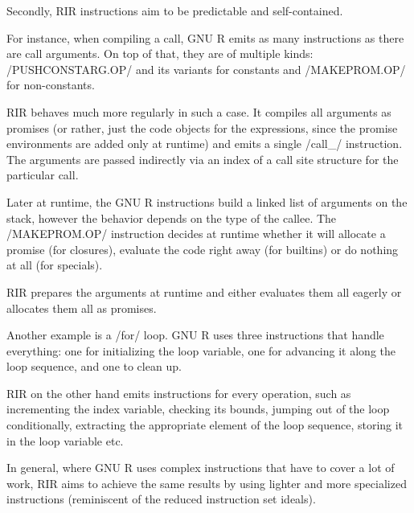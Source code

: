 Secondly, RIR instructions aim to be predictable and self-contained.

For instance, when compiling a call, GNU R emits as many instructions as there are call arguments. On top of that, they are of multiple kinds: \rinline/PUSHCONSTARG.OP/ and its variants for constants and \rinline/MAKEPROM.OP/ for non-constants.

RIR behaves much more regularly in such a case. It compiles all arguments as promises (or rather, just the code objects for the expressions, since the promise environments are added only at runtime) and emits a single \cinline/call_/ instruction. The arguments are passed indirectly via an index of a call site structure for the particular call.


Later at runtime, the GNU R instructions build a linked list of arguments on the stack, however the behavior depends on the type of the callee. The \rinline/MAKEPROM.OP/ instruction decides at runtime whether it will allocate a promise (for closures), evaluate the code right away (for builtins) or do nothing at all (for specials).


RIR prepares the arguments at runtime and either evaluates them all eagerly or allocates them all as promises.

Another example is a \rinline/for/ loop. GNU R uses three instructions that handle everything: one for initializing the loop variable, one for advancing it along the loop sequence, and one to clean up.

RIR on the other hand emits instructions for every operation, such as incrementing the index variable, checking its bounds, jumping out of the loop conditionally, extracting the appropriate element of the loop sequence, storing it in the loop variable etc.

In general, where GNU R uses complex instructions that have to cover a lot of work, RIR aims to achieve the same results by using lighter and more specialized instructions (reminiscent of the reduced instruction set ideals).


